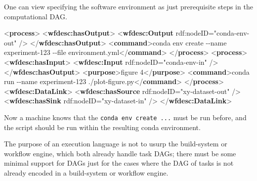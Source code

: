 \documentclass[natbib=false,manuscript,authordraft]{acmart}
\newenvironment{Shaded}{}{}
\newcommand{\KeywordTok}[1]{\textcolor[rgb]{0.00,0.44,0.13}{\textbf{#1}}}
\newcommand{\NormalTok}[1]{#1}
\newcommand{\OtherTok}[1]{\textcolor[rgb]{0.00,0.44,0.13}{#1}}
\newcommand{\StringTok}[1]{\textcolor[rgb]{0.25,0.44,0.63}{#1}}
\begin{document}
One can view specifying the software environment as just prerequisite
steps in the computational DAG.

\small

\begin{Shaded}
\begin{Highlighting}[]
\NormalTok{\textless{}}\KeywordTok{process}\NormalTok{\textgreater{}}
\NormalTok{  \textless{}}\KeywordTok{wfdesc:hasOutput}\NormalTok{\textgreater{}}
\NormalTok{    \textless{}}\KeywordTok{wfdesc:Output}\OtherTok{ rdf:nodeID=}\StringTok{"conda{-}env{-}out"}\NormalTok{ /\textgreater{}}
\NormalTok{  \textless{}/}\KeywordTok{wfdesc:hasOutput}\NormalTok{\textgreater{}}
\NormalTok{  \textless{}}\KeywordTok{command}\NormalTok{\textgreater{}conda env create {-}{-}name experiment{-}123 {-}{-}file environment.yml\textless{}/}\KeywordTok{command}\NormalTok{\textgreater{}}
\NormalTok{\textless{}/}\KeywordTok{process}\NormalTok{\textgreater{}}
\NormalTok{\textless{}}\KeywordTok{process}\NormalTok{\textgreater{}}
\NormalTok{  \textless{}}\KeywordTok{wfdesc:hasInput}\NormalTok{\textgreater{}}
\NormalTok{    \textless{}}\KeywordTok{wfdesc:Input}\OtherTok{ rdf:nodeID=}\StringTok{"conda{-}env{-}in"}\NormalTok{ /\textgreater{}}
\NormalTok{  \textless{}/}\KeywordTok{wfdesc:hasOutput}\NormalTok{\textgreater{}}
\NormalTok{  \textless{}}\KeywordTok{purpose}\NormalTok{\textgreater{}figure 4\textless{}/}\KeywordTok{purpose}\NormalTok{\textgreater{}}
\NormalTok{  \textless{}}\KeywordTok{command}\NormalTok{\textgreater{}conda run {-}{-}name experiment{-}123 ./plot{-}figure.py\textless{}/}\KeywordTok{command}\NormalTok{\textgreater{}}
\NormalTok{\textless{}/}\KeywordTok{process}\NormalTok{\textgreater{}}
\NormalTok{\textless{}}\KeywordTok{wfdesc:DataLink}\NormalTok{\textgreater{}}
\NormalTok{  \textless{}}\KeywordTok{wfdesc:hasSource}\OtherTok{ rdf:nodeID=}\StringTok{"xy{-}dataset{-}out"}\NormalTok{ /\textgreater{}}
\NormalTok{  \textless{}}\KeywordTok{wfdesc:hasSink}\OtherTok{ rdf:nodeID=}\StringTok{"xy{-}dataset{-}in"}\NormalTok{ /\textgreater{}}
\NormalTok{\textless{}/}\KeywordTok{wfdesc:DataLink}\NormalTok{\textgreater{}}
\end{Highlighting}
\end{Shaded}

\normalsize

Now a machine knows that the \texttt{conda\ env\ create\ ...} must be
run before, and the script should be run within the resulting conda
environment.

The purpose of an execution language is not to usurp the build-system or
workflow engine, which both already handle task DAGs; there must be some
minimal support for DAGs just for the cases where the DAG of tasks is
not already encoded in a build-system or workflow engine.
\end{document}
